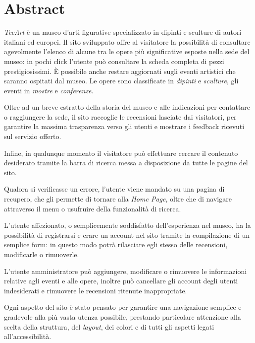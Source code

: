 \section{Abstract}
\label{abstract}
\textit{TecArt} è un museo d'arti figurative specializzato in dipinti e sculture di autori italiani ed europei. Il sito sviluppato offre al visitatore la possibilità di consultare agevolmente l'elenco di alcune tra le opere più significative esposte nella sede del museo: in pochi click l'utente può consultare la scheda completa di pezzi prestigiosissimi. È possibile anche restare aggiornati sugli eventi artistici che saranno ospitati dal museo. Le opere sono classificate in \textit{dipinti} e \textit{sculture}, gli eventi in \textit{mostre} e \textit{conferenze}.

Oltre ad un breve estratto della storia del museo e alle indicazioni per contattare o raggiungere la sede, il sito raccoglie le recensioni lasciate dai visitatori, per garantire la massima trasparenza verso gli utenti e mostrare i feedback ricevuti sul servizio offerto.

Infine, in qualunque momento il visitatore può effettuare cercare il contenuto desiderato tramite la barra di ricerca messa a disposizione da tutte le pagine del sito.

Qualora si verificasse un errore, l'utente viene mandato su una pagina di recupero, che gli permette di tornare alla \textit{Home Page}, oltre che di navigare attraverso il menu o usufruire della funzionalità di ricerca.

L'utente affezionato, o semplicemente soddisfatto dell'esperienza nel museo, ha la possibilità di registrarsi e crare un account nel sito tramite la compilazione di un semplice form: in questo modo potrà rilasciare egli stesso delle recensioni, modificarle o rimuoverle.

L'utente amministratore può aggiungere, modificare o rimuovere le informazioni relative agli eventi e alle opere, inoltre può cancellare gli account degli utenti indesiderati e rimuovere le recensioni ritenute inappropriate.

Ogni aspetto del sito è stato pensato per garantire una navigazione semplice e gradevole alla più vasta utenza possibile, prestando particolare attenzione alla scelta della struttura, del \textit{layout}, dei colori e di tutti gli aspetti legati all'accessibilità.